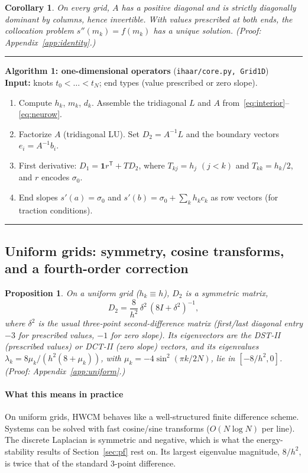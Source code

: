 \documentclass[preprint,12pt]{elsarticle}
\newtheorem{proposition}[theorem]{Proposition}
\newtheorem{corollary}[theorem]{Corollary}
\theoremstyle{remark}
\newcommand{\proofin}[1]{\hfill{\small\emph{(Proof: Appendix~\ref{#1}.)}}}
\begin{document}
\begin{corollary}\label{cor:ops}
On every grid, $A$ has a positive diagonal and is strictly diagonally dominant by columns, hence
invertible. With values prescribed at both ends, the collocation problem $s''(m_k)=f(m_k)$ has a
unique solution.
\proofin{app:identity}
\end{corollary}

\begin{algorithm}[t]\small\hrule\smallskip
\textbf{Algorithm 1: one-dimensional operators} (\texttt{ihaar/core.py, Grid1D})\\[2pt]
\textbf{Input:} knots $t_0<\dots<t_N$; end types (value prescribed or zero slope).
\begin{enumerate}
\item Compute $h_k$, $m_k$, $d_k$. Assemble the tridiagonal $L$ and $A$ from~\eqref{eq:interior}--\eqref{eq:neurow}.
\item Factorize $A$ (tridiagonal LU). Set $D_2=A^{-1}L$ and the boundary vectors $e_i=A^{-1}b_i$.
\item First derivative: $D_1=\mathbf 1 r^{\mathsf T}+T D_2$, where $T_{kj}=h_j$ $(j<k)$ and $T_{kk}=h_k/2$, and $r$ encodes $\sigma_0$.
\item End slopes $s'(a)=\sigma_0$ and $s'(b)=\sigma_0+\sum_kh_kc_k$ as row vectors (for traction conditions).
\end{enumerate}
\hrule
\end{algorithm}

\subsection{Uniform grids: symmetry, cosine transforms, and a fourth-order correction}
\begin{proposition}\label{prop:uniform}
On a uniform grid ($h_k\equiv h$), $D_2$ is a symmetric matrix,
\begin{equation}\label{eq:D2}
D_2=\frac{8}{h^2}\,\delta^2\,(8I+\delta^2)^{-1},
\end{equation}
where $\delta^2$ is the usual three-point second-difference matrix (first/last diagonal entry $-3$ for
prescribed values, $-1$ for zero slope). Its eigenvectors are the DST-II (prescribed values) or
DCT-II (zero slope) vectors, and its eigenvalues
$\lambda_k=8\mu_k/(h^2(8+\mu_k))$, with $\mu_k=-4\sin^2(\pi k/2N)$, lie in $[-8/h^2,0]$.
\proofin{app:uniform}
\end{proposition}

\paragraph{What this means in practice} On uniform grids, HWCM behaves like a well-structured finite
difference scheme. Systems can be solved with fast cosine/sine transforms ($O(N\log N)$ per line).
The discrete Laplacian is symmetric and negative, which is what the energy-stability results of
Section~\ref{sec:pf} rest on. Its largest eigenvalue magnitude, $8/h^2$, is twice that of the
standard 3-point difference.
\end{document}
